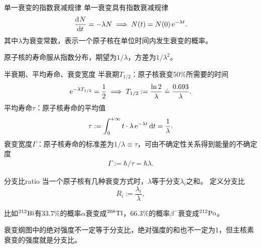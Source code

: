 \begin{theorem}
	{单一衰变的指数衰减规律}{}
	单一衰变具有指数衰减规律
	\begin{equation}
		\frac{\mathrm{d}^{{}}N}{\mathrm{d}{t}^{{}}}=-\lambda N\implies N(t)=N(0)\mathop{}\!\mathrm{e}^{-\lambda t}.
	\end{equation}
	其中$\lambda$为衰变常数，表示一个原子核在单位时间内发生衰变的概率。
\end{theorem}

\begin{corollary}
	原子核的寿命服从指数分布，期望为$1/\lambda$，方差为$1/\lambda^2$。
\end{corollary}


\begin{definition}{半衰期、平均寿命、衰变宽度}{}
	半衰期$T_{1/2}$：原子核衰变50\%所需要的时间
	\begin{equation}
		\mathop{}\!\mathrm{e}^{-\lambda T_{1/2}}=\frac12\implies T_{1/2}:=\frac{\ln 2}\lambda\doteq\frac{0.693}\lambda.
	\end{equation}
	平均寿命$\tau$：原子核寿命的平均值
	\begin{align}
		\tau:=\int_0^{+\infty} t\cdot\lambda\mathop{}\!\mathrm{e}^{-\lambda t}\mathop{}\!\mathrm{d} t=\frac1\lambda.
	\end{align}
	衰变宽度$\varGamma$：原子核寿命的标准差为$1/\lambda\equiv\tau$，可由不确定性关系得到能量的不确定度
	\begin{align}
		\varGamma:=\hbar/\tau=\hbar\lambda.
	\end{align}
\end{definition}

\begin{definition}{分支比}{ratio}
	当一个原子核有几种衰变方式时，$\lambda$等于分支$\lambda_i$之和。
	定义分支比
	\begin{equation}
		R_i:=\frac{\lambda_i}\lambda,
	\end{equation}
\end{definition}

比如${^{212}\mathrm{Bi}}$有33.7\%的概率$\alpha$衰变成${^{208}\mathrm{Tl}}$，66.3\%的概率$\beta^-$衰变成${^{212}\mathrm{Po}}$。

\begin{remark}
	衰变纲图中的绝对强度不一定等于分支比，绝对强度的和也不一定为1，但主核素衰变的强度就是分支比。
\end{remark}

